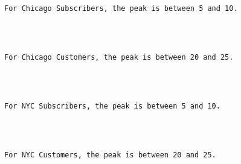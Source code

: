 \documentclass[11pt]{article}
\begin{document}
    \begin{center}
    \end{center}
    { \hspace*{\fill} \\}
    
    \begin{Verbatim}[commandchars=\\\{\}]

For Chicago Subscribers, the peak is between 5 and 10.

    \end{Verbatim}

    \begin{center}
    \end{center}
    { \hspace*{\fill} \\}
    
    \begin{Verbatim}[commandchars=\\\{\}]

For Chicago Customers, the peak is between 20 and 25.

    \end{Verbatim}

    \begin{center}
    \end{center}
    { \hspace*{\fill} \\}
    
    \begin{Verbatim}[commandchars=\\\{\}]

For NYC Subscribers, the peak is between 5 and 10.

    \end{Verbatim}

    \begin{center}
    \end{center}
    { \hspace*{\fill} \\}
    
    \begin{Verbatim}[commandchars=\\\{\}]

For NYC Customers, the peak is between 20 and 25.

    \end{Verbatim}
\end{document}
